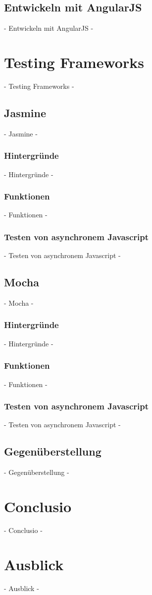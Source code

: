 \subsection{Entwickeln mit AngularJS}
 - Entwickeln mit AngularJS -

\newpage
\section{Testing Frameworks}
 - Testing Frameworks -

\subsection{Jasmine}
 - Jasmine -

\subsubsection{Hintergründe}
 - Hintergründe -
\subsubsection{Funktionen}
 - Funktionen -
\subsubsection{Testen von asynchronem Javascript}
 - Testen von asynchronem Javascript -

\subsection{Mocha}
 - Mocha -

\subsubsection{Hintergründe}
 - Hintergründe -
\subsubsection{Funktionen}
 - Funktionen -
\subsubsection{Testen von asynchronem Javascript}
 - Testen von asynchronem Javascript -

\subsection{Gegenüberstellung}
 - Gegenüberstellung -
\newpage
\section{Conclusio}
 - Conclusio -

\newpage
\section{Ausblick}
 - Ausblick -

\nocite{Green:2013}
\nocite{Kozlowski:2013}
\nocite{Hahn:2013}
\nocite{Zakas:2012}
\nocite{MacCaw:2011}
\nocite{Burnham:2011}
\nocite{Gaertner:2012}
